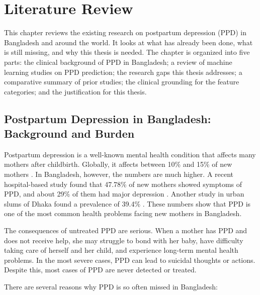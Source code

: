 
\chapter{Literature Review}
\label{ch:literature-review}

This chapter reviews the existing research on postpartum depression (PPD) in Bangladesh and around the world. It looks at what has already been done, what is still missing, and why this thesis is needed. The chapter is organized into five parts: the clinical background of PPD in Bangladesh; a review of machine learning studies on PPD prediction; the research gaps this thesis addresses; a comparative summary of prior studies; the clinical grounding for the feature categories; and the justification for this thesis.

\section{Postpartum Depression in Bangladesh: Background and Burden}
\label{ch2-sec-background}

Postpartum depression is a well-known mental health condition that affects many mothers after childbirth. Globally, it affects between 10\% and 15\% of new mothers \cite{yazdkhasti2026systematic}. In Bangladesh, however, the numbers are much higher. A recent hospital-based study found that 47.78\% of new mothers showed symptoms of PPD, and about 29\% of them had major depression \cite{shirin2024burden}. Another study in urban slums of Dhaka found a prevalence of 39.4\% \cite{azad2019economic}. These numbers show that PPD is one of the most common health problems facing new mothers in Bangladesh.

The consequences of untreated PPD are serious. When a mother has PPD and does not receive help, she may struggle to bond with her baby, have difficulty taking care of herself and her child, and experience long-term mental health problems. In the most severe cases, PPD can lead to suicidal thoughts or actions. Despite this, most cases of PPD are never detected or treated.

There are several reasons why PPD is so often missed in Bangladesh:

